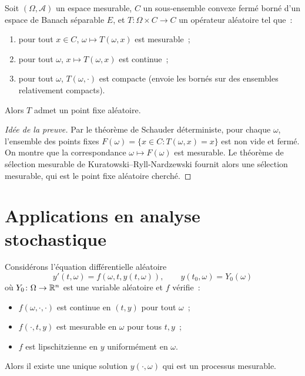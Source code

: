 \begin{theoreme}
\label{thm:pf-aleatoire-schauder}
Soit $(\Omega, \mathcal{A})$ un espace mesurable, $C$ un sous-ensemble convexe ferm\'e
born\'e d'un espace de Banach s\'eparable $E$, et $T\colon \Omega \times C \to C$ un
op\'erateur al\'eatoire tel que~:
\begin{enumerate}
  \item pour tout $x \in C$, $\omega \mapsto T(\omega, x)$ est mesurable~;
  \item pour tout $\omega$, $x \mapsto T(\omega, x)$ est continue~;
  \item pour tout $\omega$, $T(\omega, \cdot)$ est compacte (envoie les born\'es sur des
    ensembles relativement compacts).
\end{enumerate}
Alors $T$ admet un point fixe al\'eatoire.
\end{theoreme}

\begin{proof}[Id\'ee de la preuve]
Par le th\'eor\`eme de Schauder d\'eterministe, pour chaque $\omega$, l'ensemble des points
fixes $F(\omega) = \{x \in C : T(\omega, x) = x\}$ est non vide et ferm\'e. On montre que
la correspondance $\omega \mapsto F(\omega)$ est mesurable. Le th\'eor\`eme de s\'election
mesurable de Kuratowski--Ryll-Nardzewski fournit alors une s\'election mesurable, qui est
le point fixe al\'eatoire cherch\'e.
\end{proof}

\section{Applications en analyse stochastique}

\begin{proposition}
Consid\'erons l'\'equation diff\'erentielle al\'eatoire
\[
  y'(t, \omega) = f(\omega, t, y(t, \omega)), \qquad y(t_0, \omega) = Y_0(\omega)
\]
o\`u $Y_0\colon \Omega \to \mathbb{R}^n$ est une variable al\'eatoire et $f$ v\'erifie~:
\begin{itemize}
  \item $f(\omega, \cdot, \cdot)$ est continue en $(t,y)$ pour tout $\omega$~;
  \item $f(\cdot, t, y)$ est mesurable en $\omega$ pour tous $t, y$~;
  \item $f$ est lipschitzienne en $y$ uniform\'ement en $\omega$.
\end{itemize}
Alors il existe une unique solution $y(\cdot, \omega)$ qui est un processus mesurable.
\end{proposition}

